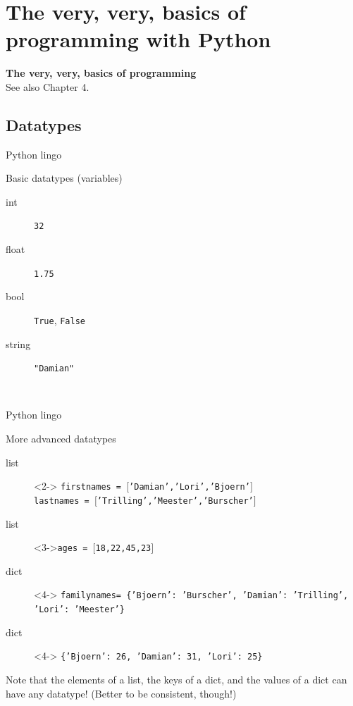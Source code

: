 
\section*[Basics]{The very, very, basics of programming with Python}
\begin{frame}[plain]
\textbf{The very, very, basics of programming}\\
\vspace{1cm}
See also Chapter 4.
\end{frame}
\subsection*{Datatypes}


\begin{frame}{Python lingo}
\begin{block}{Basic datatypes (variables)}
\begin{description}
\item[{\color{red}int}] \texttt{32}
\item[{\color{red}float}] \texttt{1.75}
\item[{\color{red}bool}] \texttt{True}, \texttt{False}
\item[{\color{red}string}] \texttt{"Damian"}
\end{description}
\end{block}
\\
\end{frame}



\begin{frame}{Python lingo}
\begin{block}{More advanced datatypes}
\begin{description}
\item[{\color{red}list}]<2-> \texttt{firstnames = $[$'Damian','Lori','Bjoern'$]$ \\ lastnames = $[$'Trilling','Meester','Burscher'$]$}
\item[{\color{red}list}]<3->\texttt{ages = $[$18,22,45,23$]$}
\item[{\color{red}dict}]<4-> \texttt{familynames= \{'Bjoern': 'Burscher', 'Damian': 'Trilling', 'Lori': 'Meester'\} }
\item[{\color{red}dict}]<4-> \texttt{\{'Bjoern': 26, 'Damian': 31, 'Lori': 25\} }

\end{description}
\pause
Note that the elements of a list, the keys of a dict, and the values of a dict can have any datatype! (Better to be consistent, though!)
\end{block}
\end{frame}


